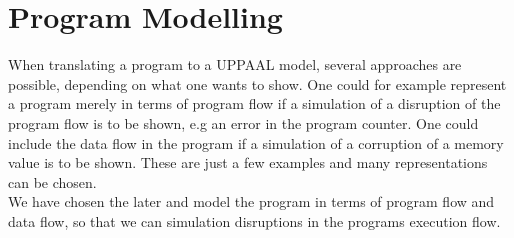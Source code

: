 \section{Program Modelling}
When translating a program to a UPPAAL model, several approaches are possible, depending on what one wants to show. One could for example represent a program merely in terms of program flow if a simulation of a disruption of the program flow is to be shown, e.g an error in the program counter. One could include the data flow in the program if a simulation of a corruption of a memory value is to be shown. These are just a few examples and many representations can be chosen.\\

We have chosen the later and model the program in terms of program flow and data flow, so that we can simulation disruptions in the programs execution flow. 




